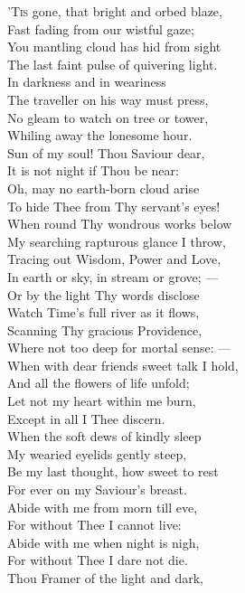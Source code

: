 ’\textsc{Tis} gone, that bright and orbed blaze, \\
 Fast fading from our wistful gaze; \\
 You mantling cloud has hid from sight \\
 The last faint pulse of quivering light. \\
  In darkness and in weariness \\
 The traveller on his way must press, \\
 No gleam to watch on tree or tower, \\
 Whiling away the lonesome hour. \\
  Sun of my soul! Thou Saviour dear, \\
 It is not night if Thou be near: \\
 Oh, may no earth-born cloud arise \\
 To hide Thee from Thy servant’s eyes! \\
  When round Thy wondrous works below \\
 My searching rapturous glance I throw, \\
 Tracing out Wisdom, Power and Love, \\
 In earth or sky, in stream or grove; — \\
  Or by the light Thy words disclose \\
 Watch Time’s full river as it flows, \\
 Scanning Thy gracious Providence, \\
 Where not too deep for mortal sense: — \\
  When with dear friends sweet talk I hold, \\
 And all the flowers of life unfold; \\
 Let not my heart within me burn, \\
 Except in all I Thee discern. \\
  When the soft dews of kindly sleep \\
 My wearied eyelids gently steep, \\
 Be my last thought, how sweet to rest \\
 For ever on my Saviour’s breast. \\
  Abide with me from morn till eve, \\
 For without Thee I cannot live: \\
 Abide with me when night is nigh, \\
 For without Thee I dare not die. \\
  Thou Framer of the light and dark, \\
